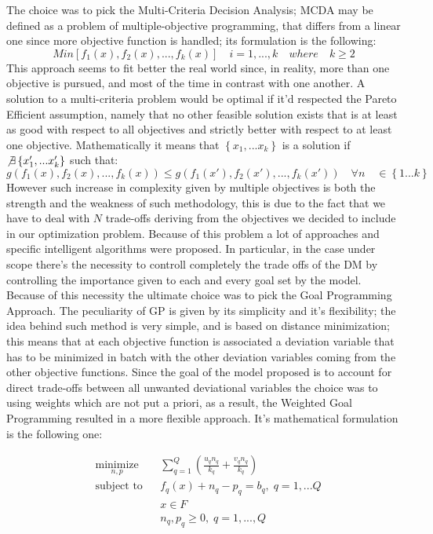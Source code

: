 \documentclass{article}
\begin{document}
The choice was to pick the Multi-Criteria Decision Analysis; MCDA may be defined as a problem of multiple-objective programming, that differs from a linear one since more objective function is handled; its formulation is the following:
	$$
	Min[f_1(x),f_2(x),...,f_k(x)] \quad i=1,...,k \quad where \quad k\geq2
	$$
	This approach seems to fit better the real world since, in reality, more than one objective is pursued, and most of the time in contrast with one another\cite{greco_multiple_2016}.
A solution to a multi-criteria problem would be optimal if it'd respected the Pareto Efficient assumption, namely that no other feasible solution exists that is at least as good with respect to all objectives and strictly better with respect to at least one objective. Mathematically it means that $\left\{x_1,...x_k\right\}$ is a solution if $\not\exists \left\{x'_1,...x'_k\right\}$
such that:
	\[
	g(f_1(x),f_2(x),...,f_k(x)) \leq g(f_1(x'),f_2(x'),...,f_k(x')) \quad \forall n \quad \in  \left\{1...k\right\}
	\]
However such increase in complexity given by multiple objectives is both the strength and the weakness of such methodology, this is due to the fact that we have to deal with $N$ trade-offs deriving from the objectives we decided to include in our optimization problem. Because of this problem a lot of approaches and specific intelligent algorithms were proposed\cite{Cui2017}.
In particular, in the case under scope there's the necessity to controll completely the trade offs of the DM by controlling the importance given to each and every goal set by the model. Because of this necessity the ultimate choice was to pick the Goal Programming Approach\cite{charnes_optimal_1955}.
The peculiarity of GP is given by its simplicity and it's flexibility\cite{colapinto_multi-criteria_2017}\cite{tamiz_goal_1998}; the idea behind such method is very simple, and is based on distance minimization; this means that at each objective function is associated a deviation variable that has to be minimized in batch with the other deviation variables coming from the other objective functions. Since the goal of the model proposed is to account for direct trade-offs between all unwanted deviational variables the choice was to using weights which are not put a priori, as a result, the Weighted Goal Programming resulted in a more flexible approach. It's mathematical formulation is the following one:

\begin{equation*}
\begin{aligned}
& \underset{n,p}{\text{minimize}}
& & \sum_{q=1}^{Q}(\frac{u_q n_q}{k_q}+\frac{v_q n_q}{k_q}) \\
& \text{subject to}
& & f_q(x)+n_q-p_q=b_q, \; q=1,...Q \\
& & & x\in F \\
& & & n_q,p_q\geq 0, \; q=1,...,Q 
\end{aligned}
\end{equation*}
\end{document}

